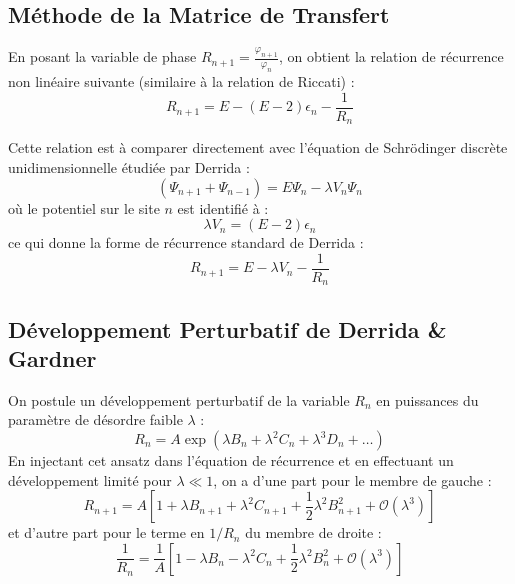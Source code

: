 \subsection{Méthode de la Matrice de Transfert}

En posant la variable de phase $R_{n+1} = \frac{\varphi_{n+1}}{\varphi_n}$, on obtient la relation de récurrence non linéaire suivante (similaire à la relation de Riccati) :
\begin{equation}
    R_{n+1} = E - (E - 2)\epsilon_n - \frac{1}{R_n} \label{eq:recurrence}
\end{equation}

Cette relation est à comparer directement avec l'équation de Schrödinger discrète unidimensionnelle étudiée par Derrida :
\begin{equation*}
    (\Psi_{n+1} + \Psi_{n-1}) = E\Psi_n - \lambda V_n \Psi_n
\end{equation*}
où le potentiel sur le site $n$ est identifié à :
\begin{equation*}
    \lambda V_n = (E - 2)\epsilon_n
\end{equation*}
ce qui donne la forme de récurrence standard de Derrida :
\begin{equation*}
    R_{n+1} = E - \lambda V_n - \frac{1}{R_n}
\end{equation*}

\subsection{Développement Perturbatif de Derrida \& Gardner}

On postule un développement perturbatif de la variable $R_n$ en puissances du paramètre de désordre faible $\lambda$ :
\begin{equation*}
    R_n = A \exp\left( \lambda B_n + \lambda^2 C_n + \lambda^3 D_n + \dots \right)
\end{equation*}
En injectant cet ansatz dans l'équation de récurrence et en effectuant un développement limité pour $\lambda \ll 1$, on a d'une part pour le membre de gauche :
\begin{equation*}
    R_{n+1} = A \left[ 1 + \lambda B_{n+1} + \lambda^2 C_{n+1} + \frac{1}{2}\lambda^2 B_{n+1}^2 + \mathcal{O}(\lambda^3) \right]
\end{equation*}
et d'autre part pour le terme en $1/R_n$ du membre de droite :
\begin{equation*}
    \frac{1}{R_n} = \frac{1}{A} \left[ 1 - \lambda B_n - \lambda^2 C_n + \frac{1}{2}\lambda^2 B_n^2 + \mathcal{O}(\lambda^3) \right]
\end{equation*}

